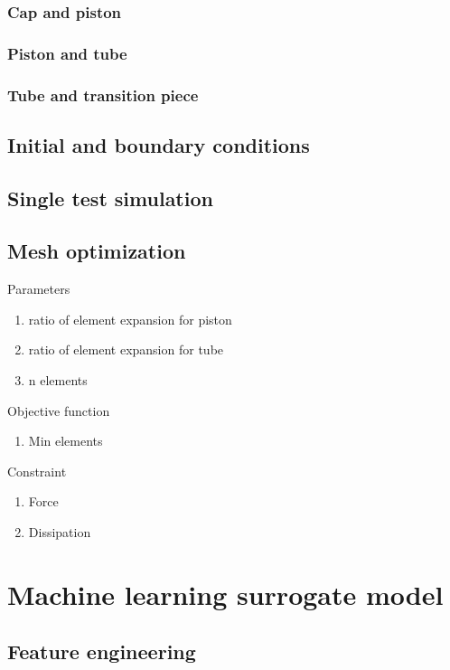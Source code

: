 \documentclass{article}
\begin{document}
\subsubsection{Cap and piston}
\subsubsection{Piston and tube}
\subsubsection{Tube and transition piece}

\subsection{Initial and boundary conditions}
\subsection{Single test simulation}

\subsection{Mesh optimization}

Parameters
\begin{enumerate}
	\item ratio of element expansion for piston
	\item ratio of element expansion for tube
	\item n elements
\end{enumerate}

Objective function
\begin{enumerate}
	\item Min elements
\end{enumerate}

Constraint
\begin{enumerate}
	\item Force
	\item Dissipation
\end{enumerate}

\section{Machine learning surrogate model}
\subsection{Feature engineering}
\end{document}
